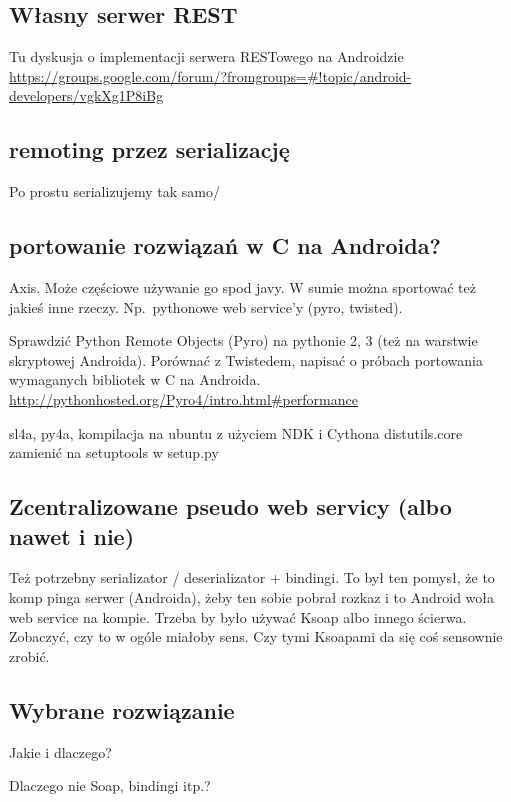 \subsection{Własny serwer REST}
Tu dyskusja o implementacji serwera RESTowego na Androidzie \url{https://groups.google.com/forum/?fromgroups=#!topic/android-developers/vgkXg1P8iBg}

\subsection{remoting przez serializację}
Po prostu serializujemy tak samo/

\subsection{portowanie rozwiązań w C na Androida?}
Axis. Może częściowe używanie go spod javy. W sumie można sportować też jakieś inne rzeczy. Np.\ pythonowe web service'y (pyro, twisted).

Sprawdzić Python Remote Objects (Pyro) na pythonie 2, 3 (też na warstwie skryptowej Androida). Porównać z Twistedem, napisać o próbach portowania wymaganych bibliotek w C na Androida. \url{http://pythonhosted.org/Pyro4/intro.html#performance}

sl4a, py4a, kompilacja na ubuntu z użyciem NDK i Cythona
distutils.core zamienić na setuptools w setup.py

\subsection{Zcentralizowane pseudo web servicy (albo nawet i nie)}
Też potrzebny serializator / deserializator + bindingi. To był ten pomysł, że to komp pinga serwer (Androida), żeby ten sobie pobrał rozkaz i to Android woła web service na kompie. Trzeba by było używać Ksoap albo innego ścierwa. Zobaczyć, czy to w ogóle miałoby sens. Czy tymi Ksoapami da się coś sensownie zrobić.

\subsection{Wybrane rozwiązanie}
Jakie i dlaczego?

Dlaczego nie Soap, bindingi itp.?
